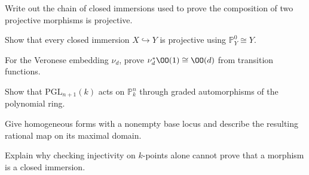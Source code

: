 \begin{exercise}\label{exr:vi38-19}
Write out the chain of closed immersions used to prove the composition of two projective morphisms is projective.
\end{exercise}

\begin{exercise}\label{exr:vi38-20}
Show that every closed immersion \(X\hookrightarrow Y\) is projective using \(\mathbb P^0_Y\cong Y\).
\end{exercise}

\begin{exercise}\label{exr:vi38-21}
For the Veronese embedding \(\nu_d\), prove \(\nu_d^*\OO(1)\cong\OO(d)\) from transition functions.
\end{exercise}

\begin{exercise}\label{exr:vi38-22}
Show that \(\mathrm{PGL}_{n+1}(k)\) acts on \(\mathbb P^n_k\) through graded automorphisms of the polynomial ring.
\end{exercise}

\begin{exercise}\label{exr:vi38-23}
Give homogeneous forms with a nonempty base locus and describe the resulting rational map on its maximal domain.
\end{exercise}

\begin{exercise}\label{exr:vi38-24}
Explain why checking injectivity on \(k\)-points alone cannot prove that a morphism is a closed immersion.
\end{exercise}
